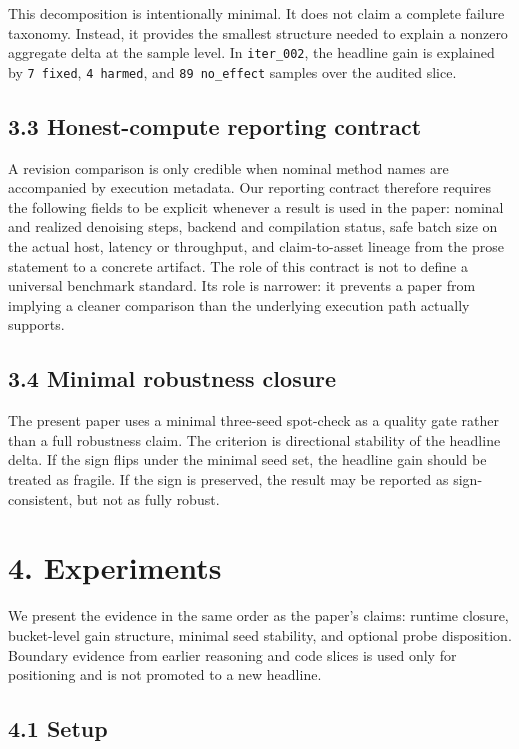 \documentclass{article}
\begin{document}
This decomposition is intentionally minimal. It does not claim a complete failure taxonomy. Instead, it provides the smallest structure needed to explain a nonzero aggregate delta at the sample level. In \texttt{iter\_002}, the headline gain is explained by \texttt{7 fixed}, \texttt{4 harmed}, and \texttt{89 no\_effect} samples over the audited slice.

\subsection{3.3 Honest-compute reporting contract}

A revision comparison is only credible when nominal method names are accompanied by execution metadata. Our reporting contract therefore requires the following fields to be explicit whenever a result is used in the paper: nominal and realized denoising steps, backend and compilation status, safe batch size on the actual host, latency or throughput, and claim-to-asset lineage from the prose statement to a concrete artifact. The role of this contract is not to define a universal benchmark standard. Its role is narrower: it prevents a paper from implying a cleaner comparison than the underlying execution path actually supports.

\subsection{3.4 Minimal robustness closure}

The present paper uses a minimal three-seed spot-check as a quality gate rather than a full robustness claim. The criterion is directional stability of the headline delta. If the sign flips under the minimal seed set, the headline gain should be treated as fragile. If the sign is preserved, the result may be reported as sign-consistent, but not as fully robust.

\section{4. Experiments}

We present the evidence in the same order as the paper's claims: runtime closure, bucket-level gain structure, minimal seed stability, and optional probe disposition. Boundary evidence from earlier reasoning and code slices is used only for positioning and is not promoted to a new headline.

\subsection{4.1 Setup}
\end{document}
